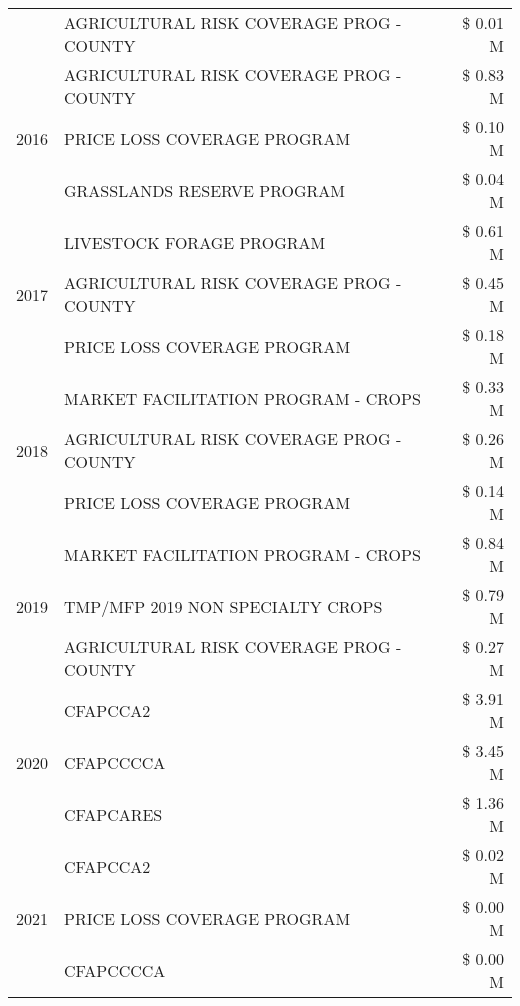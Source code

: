 \begin{tabular}{llr}
 & AGRICULTURAL RISK COVERAGE PROG - COUNTY & \$ 0.01 M \\
\cline{1-3}
\multirow[t]{3}{*}{2016} & AGRICULTURAL RISK COVERAGE PROG - COUNTY & \$ 0.83 M \\
 & PRICE LOSS COVERAGE PROGRAM & \$ 0.10 M \\
 & GRASSLANDS RESERVE PROGRAM & \$ 0.04 M \\
\cline{1-3}
\multirow[t]{3}{*}{2017} & LIVESTOCK FORAGE PROGRAM & \$ 0.61 M \\
 & AGRICULTURAL RISK COVERAGE PROG - COUNTY & \$ 0.45 M \\
 & PRICE LOSS COVERAGE PROGRAM & \$ 0.18 M \\
\cline{1-3}
\multirow[t]{3}{*}{2018} & MARKET FACILITATION PROGRAM - CROPS & \$ 0.33 M \\
 & AGRICULTURAL RISK COVERAGE PROG - COUNTY & \$ 0.26 M \\
 & PRICE LOSS COVERAGE PROGRAM & \$ 0.14 M \\
\cline{1-3}
\multirow[t]{3}{*}{2019} & MARKET FACILITATION PROGRAM - CROPS & \$ 0.84 M \\
 & TMP/MFP 2019 NON SPECIALTY CROPS & \$ 0.79 M \\
 & AGRICULTURAL RISK COVERAGE PROG - COUNTY & \$ 0.27 M \\
\cline{1-3}
\multirow[t]{3}{*}{2020} & CFAPCCA2 & \$ 3.91 M \\
 & CFAPCCCCA & \$ 3.45 M \\
 & CFAPCARES & \$ 1.36 M \\
\cline{1-3}
\multirow[t]{3}{*}{2021} & CFAPCCA2 & \$ 0.02 M \\
 & PRICE LOSS COVERAGE PROGRAM & \$ 0.00 M \\
 & CFAPCCCCA & \$ 0.00 M \\
\cline{1-3}
\bottomrule
\end{tabular}
